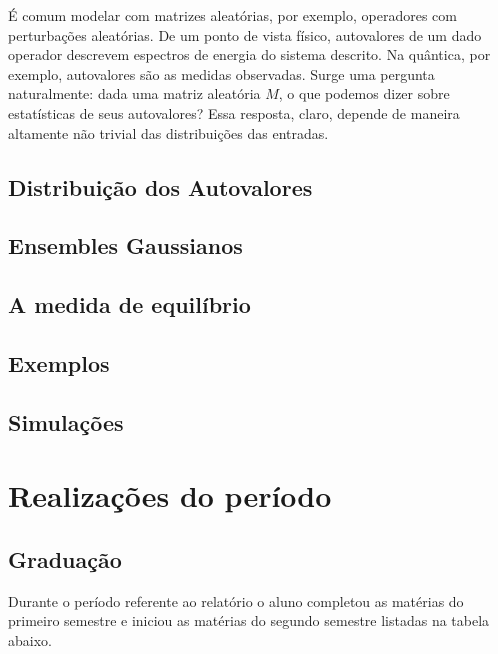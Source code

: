 \documentclass[12pt]{report}
\begin{document}
	É comum modelar com matrizes aleatórias, por exemplo, operadores com perturbações aleatórias. De um ponto de vista físico, autovalores de um dado operador descrevem espectros de energia do sistema descrito. Na quântica, por exemplo, autovalores são as medidas observadas. Surge uma pergunta naturalmente: dada uma matriz aleatória $M$, o que podemos dizer sobre estatísticas de seus autovalores? Essa resposta, claro, depende de maneira altamente não trivial das distribuições das entradas.  
	
	\section{Distribuição dos Autovalores}
	
	
	
	\section{Ensembles Gaussianos}
	
	

	\section{A medida de equilíbrio}
	
	
	
	\section{Exemplos}
	
	
	
	\section{Simulações}
	
	
	
	{\let\clearpage\relax \chapter{Realizações do período}}
	\label{chp:realizacoes}
	
	\section{Graduação}
	
	Durante o período referente ao relatório o aluno completou as matérias do primeiro semestre e iniciou as matérias do segundo semestre listadas na tabela abaixo.
	
\end{document}
